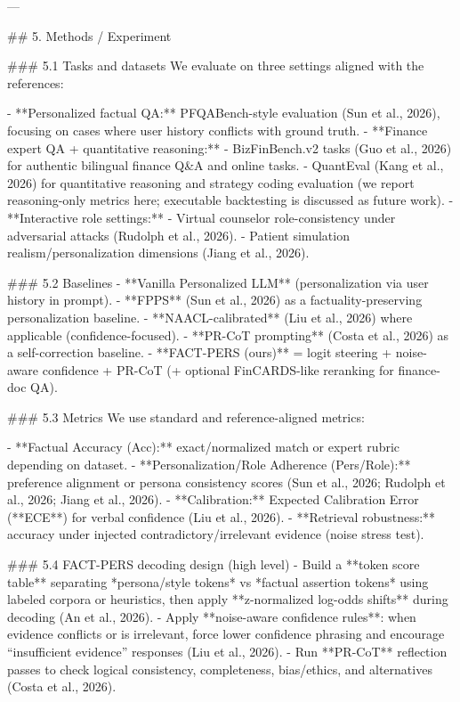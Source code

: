 ---

## 5. Methods / Experiment  

### 5.1 Tasks and datasets  
We evaluate on three settings aligned with the references:

- **Personalized factual QA:** PFQABench-style evaluation (Sun et al., 2026), focusing on cases where user history conflicts with ground truth.  
- **Finance expert QA + quantitative reasoning:**  
  - BizFinBench.v2 tasks (Guo et al., 2026) for authentic bilingual finance Q&A and online tasks.  
  - QuantEval (Kang et al., 2026) for quantitative reasoning and strategy coding evaluation (we report reasoning-only metrics here; executable backtesting is discussed as future work).  
- **Interactive role settings:**  
  - Virtual counselor role-consistency under adversarial attacks (Rudolph et al., 2026).  
  - Patient simulation realism/personalization dimensions (Jiang et al., 2026).

### 5.2 Baselines  
- **Vanilla Personalized LLM** (personalization via user history in prompt).  
- **FPPS** (Sun et al., 2026) as a factuality-preserving personalization baseline.  
- **NAACL-calibrated** (Liu et al., 2026) where applicable (confidence-focused).  
- **PR-CoT prompting** (Costa et al., 2026) as a self-correction baseline.  
- **FACT-PERS (ours)** = logit steering + noise-aware confidence + PR-CoT (+ optional FinCARDS-like reranking for finance-doc QA).

### 5.3 Metrics  
We use standard and reference-aligned metrics:

- **Factual Accuracy (Acc):** exact/normalized match or expert rubric depending on dataset.  
- **Personalization/Role Adherence (Pers/Role):** preference alignment or persona consistency scores (Sun et al., 2026; Rudolph et al., 2026; Jiang et al., 2026).  
- **Calibration:** Expected Calibration Error (**ECE**) for verbal confidence (Liu et al., 2026).  
- **Retrieval robustness:** accuracy under injected contradictory/irrelevant evidence (noise stress test).  

### 5.4 FACT-PERS decoding design (high level)  
- Build a **token score table** separating *persona/style tokens* vs *factual assertion tokens* using labeled corpora or heuristics, then apply **z-normalized log-odds shifts** during decoding (An et al., 2026).  
- Apply **noise-aware confidence rules**: when evidence conflicts or is irrelevant, force lower confidence phrasing and encourage “insufficient evidence” responses (Liu et al., 2026).  
- Run **PR-CoT** reflection passes to check logical consistency, completeness, bias/ethics, and alternatives (Costa et al., 2026).  

